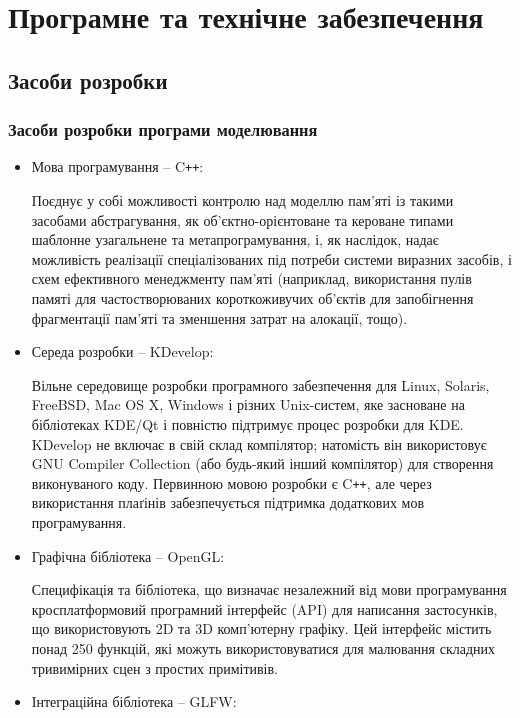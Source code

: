 \section{Програмне та технічне забезпечення}
\subsection{Засоби розробки}
\subsubsection{Засоби розробки програми моделювання}
\begin{itemize}[label=\Large$\diamond$]\itemsep1em
  \item Мова програмування -- C\verb!++!:

    Поєднує у собі можливості контролю над моделлю пам'яті із такими засобами абстрагування, як об'єктно-орієнтоване та кероване типами шаблонне узагальнене та метапрограмування, і, як наслідок, надає можливість реалізації спеціалізованих під потреби системи виразних засобів, і схем ефективного менеджменту пам'яті (наприклад, використання пулів памяті для частостворюваних короткоживучих об'єктів для запобігнення фрагментації пам'яті та зменшення затрат на алокації, тощо).

  \item Середа розробки -- KDevelop:

    Вільне середовище розробки програмного забезпечення для Linux, Solaris, FreeBSD, Mac OS X, Windows і різних Unix-систем, яке засноване на бібліотеках KDE/Qt і повністю підтримує процес розробки для KDE. KDevelop не включає в свій склад компілятор; натомість він використовує GNU Compiler Collection (або будь-який інший компілятор) для створення виконуваного коду. Первинною мовою розробки є C\verb!++!, але через використання плаґінів забезпечується підтримка додаткових мов програмування.

  \item Графічна бібліотека -- OpenGL:

    Специфікація та бібліотека, що визначає незалежний від мови програмування кросплатформовий програмний інтерфейс (API) для написання застосунків, що використовують 2D та 3D комп'ютерну графіку. Цей інтерфейс містить понад 250 функцій, які можуть використовуватися для малювання складних тривимірних сцен з простих примітивів.

  \item Інтеграційна бібліотека -- GLFW:


\end{itemize}
